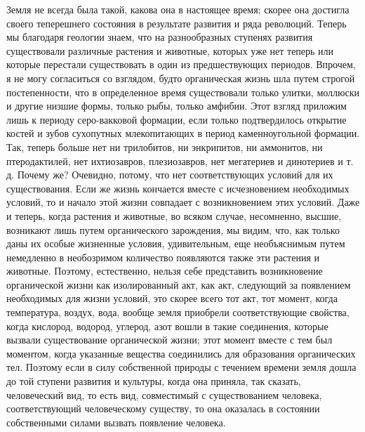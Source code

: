 \documentclass[12pt,oneside]{book}
\begin{document}
Земля не всегда была такой, какова она в настоящее время; скорее она достигла своего теперешнего состояния в результате развития и ряда революций. Теперь мы благодаря геологии знаем, что на разнообразных ступенях развития существовали различные растения и животные, которых уже нет теперь или которые перестали существовать в один из предшествующих периодов. Впрочем, я не могу согласиться со взглядом, будто органическая жизнь шла путем строгой постепенности, что в определенное время существовали только улитки, моллюски и другие низшие формы, только рыбы, только амфибии. Этот взгляд приложим лишь к периоду серо-вакковой формации, если только подтвердилось открытие костей и зубов сухопутных млекопитающих в период каменноугольной формации. Так, теперь больше нет ни трилобитов, ни энкрипитов, ни аммонитов, ни птеродактилей, нет ихтиозавров, плезиозавров, нет мегатериев и динотериев и т. д. Почему же? Очевидно, потому, что нет соответствующих условий для их существования. Если же жизнь кончается вместе с исчезновением необходимых условий, то и начало этой жизни совпадает с возникновением этих условий. Даже и теперь, когда растения и животные, во всяком случае, несомненно, высшие, возникают лишь путем органического зарождения, мы видим, что, как только даны их особые жизненные условия, удивительным, еще необъяснимым путем немедленно в необозримом количество появляются также эти растения и животные. Поэтому, естественно, нельзя себе представить возникновение органической жизни как изолированный акт, как акт, следующий за появлением необходимых для жизни условий, это скорее всего тот акт, тот момент, когда температура, воздух, вода, вообще земля приобрели соответствующие свойства, когда кислород, водород, углерод, азот вошли в такие соединения, которые вызвали существование органической жизни; этот момент вместе с тем был моментом, когда указанные вещества соединились для образования органических тел. Поэтому если в силу собственной природы с течением времени земля дошла до той ступени развития и культуры, когда она приняла, так сказать, человеческий вид, то есть вид, совместимый с существованием человека, соответствующий человеческому существу, то она оказалась в состоянии собственными силами вызвать появление человека.



\chapter{}
\end{document}
